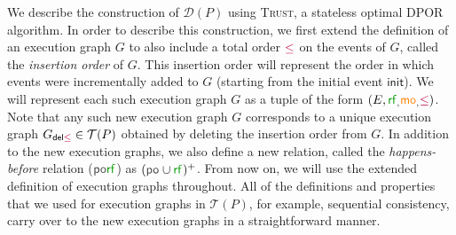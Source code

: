 \documentclass[acmsmall]{acmart}
\def\MO#1{{\textcolor{orange}{\textbf{MO:} #1}}}
\def\BA#1{{\textcolor{violet}{\textbf{BA: } #1}}}
\renewcommand{\BA}[1]{}
\renewcommand{\MO}[1]{}
\newcommand{\trust}{\textsc{Trust}\xspace}
\newcommand{\dpor}{\textsc{DPOR}\xspace}
\newcommand{\init}{\mathsf{init}}
\newcommand{\rf}[1]{{\textcolor{green!60!black}{\mathsf{rf}}_{#1}}}
\newcommand{\mo}[1]{{\textcolor{orange}{\mathsf{mo}}_{#1}}}
\newcommand{\po}[1]{{\textcolor{darkgray}{\mathsf{po}}_{#1}}}
\newcommand{\porf}[1]{\textcolor{darkgray}{\mathsf{po}\textcolor{green!60!black}{\mathsf{rf}}}_{#1}}
\newcommand{\inord}{\textcolor{purple}\leq}
\begin{document}
We describe the construction of $\mathcal{D}(P)$ using \trust\cite{trust}, a stateless optimal \dpor algorithm. In order to describe this construction, we first extend the definition of an execution graph $G$ to also include a total order $\inord$ on the events of $G$, called the \emph{insertion order} of $G$. This insertion order will represent the order in which events were incrementally added to $G$ (starting from the initial event $\init$). We will represent each such execution graph $G$ as a tuple of the form $(E,\rf,\mo,\inord)$. Note that any such new execution graph $G$ corresponds to a unique execution graph $G_{\textsf{del} \inord} \in \mathcal{T}(P)$ obtained by deleting the insertion order from $G$.
In addition to the new execution graphs, we also define a new relation, called the \emph{happens-before} relation  ($\porf{}$) as $(\po{} \cup \rf{})^+$.
From now on, we will use the extended definition of execution graphs throughout.
All of the definitions and properties that we used for execution graphs in $\mathcal{T}(P)$, for example, sequential consistency, carry over to the new execution graphs in a straightforward manner. 
\end{document}
